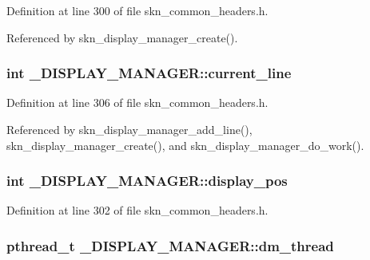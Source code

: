 Definition at line 300 of file skn\+\_\+common\+\_\+headers.\+h.



Referenced by skn\+\_\+display\+\_\+manager\+\_\+create().

\hypertarget{struct___d_i_s_p_l_a_y___m_a_n_a_g_e_r_aae8a6a90422fd9f571dff5f455740aa4}{
\subsubsection[{current\+\_\+line}]{\setlength{\rightskip}{0pt plus 5cm}int \+\_\+\+D\+I\+S\+P\+L\+A\+Y\+\_\+\+M\+A\+N\+A\+G\+E\+R\+::current\+\_\+line}}\label{struct___d_i_s_p_l_a_y___m_a_n_a_g_e_r_aae8a6a90422fd9f571dff5f455740aa4}


Definition at line 306 of file skn\+\_\+common\+\_\+headers.\+h.



Referenced by skn\+\_\+display\+\_\+manager\+\_\+add\+\_\+line(), skn\+\_\+display\+\_\+manager\+\_\+create(), and skn\+\_\+display\+\_\+manager\+\_\+do\+\_\+work().

\hypertarget{struct___d_i_s_p_l_a_y___m_a_n_a_g_e_r_aa910f0f6b6ce599a8be02853214d860c}{
\subsubsection[{display\+\_\+pos}]{\setlength{\rightskip}{0pt plus 5cm}int \+\_\+\+D\+I\+S\+P\+L\+A\+Y\+\_\+\+M\+A\+N\+A\+G\+E\+R\+::display\+\_\+pos}}\label{struct___d_i_s_p_l_a_y___m_a_n_a_g_e_r_aa910f0f6b6ce599a8be02853214d860c}


Definition at line 302 of file skn\+\_\+common\+\_\+headers.\+h.

\hypertarget{struct___d_i_s_p_l_a_y___m_a_n_a_g_e_r_a7033f795cd887063d36c11556c368e6f}{
\subsubsection[{dm\+\_\+thread}]{\setlength{\rightskip}{0pt plus 5cm}pthread\+\_\+t \+\_\+\+D\+I\+S\+P\+L\+A\+Y\+\_\+\+M\+A\+N\+A\+G\+E\+R\+::dm\+\_\+thread}}\label{struct___d_i_s_p_l_a_y___m_a_n_a_g_e_r_a7033f795cd887063d36c11556c368e6f}


